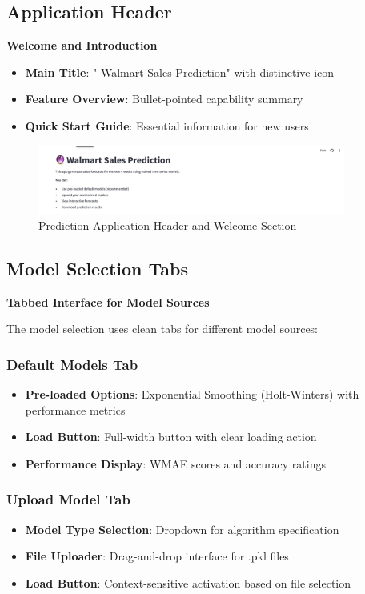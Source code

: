 \subsection{Application Header}

\textbf{Welcome and Introduction}
\begin{itemize}
    \item \textbf{Main Title}: " Walmart Sales Prediction" with distinctive icon
    \item \textbf{Feature Overview}: Bullet-pointed capability summary
    \item \textbf{Quick Start Guide}: Essential information for new users
\end{itemize}

\begin{figure}[H]
    \centering
    \includegraphics[width=0.9\textwidth]{Images/04GUIAndUserInterface/PredictionHeader.png}
    \caption{Prediction Application Header and Welcome Section}
    \label{fig:prediction_header}
\end{figure}

\subsection{Model Selection Tabs}

\textbf{Tabbed Interface for Model Sources}

The model selection uses clean tabs for different model sources:

\subsubsection{Default Models Tab}
\begin{itemize}
    \item \textbf{Pre-loaded Options}: Exponential Smoothing (Holt-Winters) with performance metrics
    \item \textbf{Load Button}: Full-width button with clear loading action
    \item \textbf{Performance Display}: WMAE scores and accuracy ratings
\end{itemize}

\subsubsection{Upload Model Tab}
\begin{itemize}
    \item \textbf{Model Type Selection}: Dropdown for algorithm specification
    \item \textbf{File Uploader}: Drag-and-drop interface for .pkl files
    \item \textbf{Load Button}: Context-sensitive activation based on file selection
\end{itemize}

